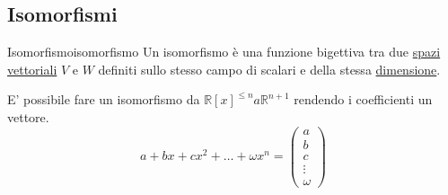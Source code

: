 \documentclass{article}
\begin{document}
\subsection{Isomorfismi}

\begin{definition}{Isomorfismo}{isomorfismo}
    Un isomorfismo è una funzione bigettiva tra due \hyperref[def:spazio_vettoriale]{spazi vettoriali} $V$ e $W$ definiti sullo stesso campo di scalari e della stessa \hyperref[def:dimensione_spazio_vettoriale]{dimensione}.
\end{definition}

E' possibile fare un isomorfismo da $\mathbb{R}[x]^{\le{n}} a \mathbb{R}^{n+1}$ rendendo i coefficienti un vettore. \[a + bx + cx^2 + \dots + \omega x^n = \begin{pmatrix}
    a \\
    b \\
    c \\
    \vdots \\
    \omega
\end{pmatrix}\]
\end{document}
